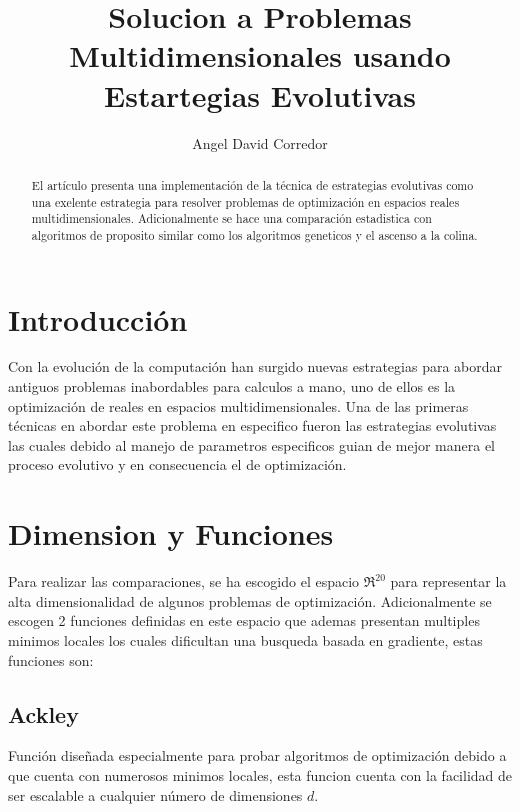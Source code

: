 \documentclass[twocolumn]{IEEEtran}
\begin{document}
\title{Solucion a Problemas Multidimensionales usando Estartegias Evolutivas}
\author{Angel David Corredor}
\date{}
\maketitle

\begin{abstract}
    El artículo presenta una implementación de la técnica de estrategias evolutivas
    como una exelente estrategia para resolver problemas de optimización en espacios
    reales multidimensionales. Adicionalmente se hace una comparación estadistica con
    algoritmos de proposito similar como los algoritmos geneticos y el ascenso a la colina. 
\end{abstract}

\section{Introducción}

Con la evolución de la computación han surgido nuevas estrategias para abordar antiguos problemas
inabordables para calculos a mano, uno de ellos es la optimización de reales en espacios 
multidimensionales. Una de las primeras técnicas en abordar este problema en especifico fueron
las estrategias evolutivas %
las cuales debido al manejo de parametros especificos guian de mejor manera el proceso evolutivo
y en consecuencia el de optimización.

\section{Dimension y Funciones}

Para realizar las comparaciones, se ha escogido el espacio $\Re^{20}$ para representar la alta
dimensionalidad de algunos problemas de optimización. Adicionalmente se escogen 2 funciones 
definidas en este espacio que ademas presentan multiples minimos locales los cuales dificultan
una busqueda basada en gradiente, estas funciones son:

\subsection{Ackley}
Función diseñada especialmente para probar algoritmos de optimización debido a que cuenta con
numerosos minimos locales, esta funcion cuenta con la facilidad de ser escalable a cualquier 
número de dimensiones $d$.
\end{document}
